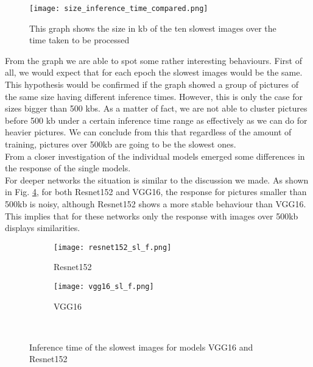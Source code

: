 \begin{figure}[h]
       \centering 
	    \texttt{[image: size\_inference\_time\_compared.png]}
        \caption[Size of the images over inference time]{This graph shows the size in kb of the ten slowest images over the time taken to be processed }
         \label{fig:size_inference_time_compared}
\end{figure}



From the graph we are able to spot some rather interesting behaviours. First of all, we would expect that for each epoch the slowest images would be the same. This hypothesis would be confirmed if the graph showed a group of pictures of the same size having different inference times. However, this is only the case for sizes bigger than 500 kbs. As a matter of fact, we are not able to cluster pictures before 500 kb under a certain inference time range as effectively as we can do for heavier pictures. We can conclude from this that regardless of the amount of training, pictures over 500kb are going to be the slowest ones. \\
From a closer investigation of the individual models emerged some differences in the response of the single models. \\
For deeper networks the situation is similar to the discussion we made. As shown in Fig. \ref{fig:sl_f_deep}, for both Resnet152 and VGG16, the response for pictures smaller than 500kb is noisy, although Resnet152 shows a more stable behaviour than VGG16. This implies that for these networks only the response with images over 500kb displays similarities.  
\begin{figure}[h]
     \begin{subfigure}{0.5\textwidth}
	    \texttt{[image: resnet152\_sl\_f.png]}
	    \caption{Resnet152}
         \label{fig:resnet152_sl_f}
         
     \end{subfigure}
     \hfill
     \begin{subfigure}{0.5\textwidth}
	    \texttt{[image: vgg16\_sl\_f.png]}
	    \caption{VGG16}
        \label{fig:vgg16_sl_f}
        
     \end{subfigure}\\
     \caption{Inference time of the slowest images for models VGG16 and Resnet152}
        \label{fig:sl_f_deep}
\end{figure}

